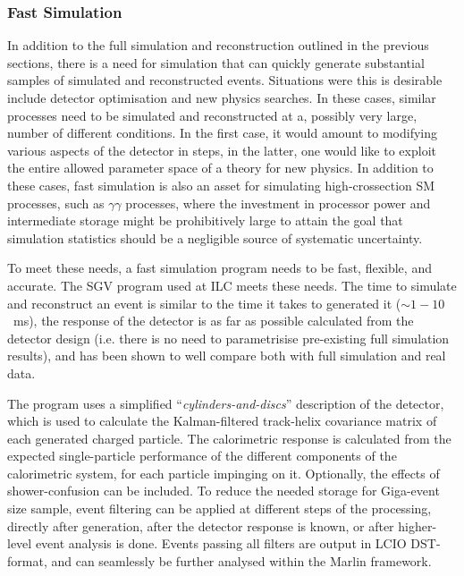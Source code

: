 \subsubsection{Fast Simulation}

In addition to the full simulation and reconstruction 
outlined in the previous sections,
there is a need for simulation that can quickly generate
substantial samples of simulated and reconstructed events.
Situations were this is desirable include detector optimisation
and new physics searches. In these cases,
similar processes need to be simulated and reconstructed at
a, possibly very large, number of different conditions.
In the first case, it would amount to modifying various aspects
of the detector in steps, in the latter,
one would like to exploit the entire allowed parameter space
of a theory for new physics.
In addition to these cases,
fast simulation is also an asset for simulating high-crossection
SM processes, such as $\gamma\gamma$ processes, where the investment 
in processor power and intermediate storage might be
prohibitively large to attain the goal that simulation statistics
should be a negligible source of systematic uncertainty.

To meet these needs,
a fast simulation program needs to be fast, flexible, and
accurate. 
The SGV program used at ILC meets these needs.
The time to simulate and reconstruct an event is similar to
the time it takes to generated it ($\sim 1-10$~ms),
the response of the detector is as far as possible calculated
from the detector design (i.e. there is no need to parametrisise
pre-existing full simulation results),
and has been shown to well compare both with full simulation
and real data.

The program uses a simplified ``{\it cylinders-and-discs}'' description
of the detector,
which is used to calculate the Kalman-filtered track-helix covariance matrix
of each generated charged particle.
The calorimetric response is calculated from the expected single-particle
performance of the different components of the calorimetric system,
for each particle impinging on it. Optionally,
the effects of shower-confusion can be included.
To reduce the needed storage for Giga-event size sample,
event filtering can be applied at different steps of the processing,
directly after generation, after the detector response is known,
or after higher-level event analysis is done.
Events passing all filters are output in LCIO DST-format,
and can seamlessly be further analysed within the Marlin framework.




